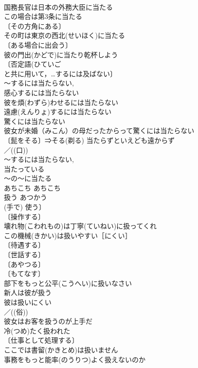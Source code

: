 \documentclass[8pt]{extreport}
\begin{document}
\begin{CJK}{UTF8}{min}
\\	国務長官は日本の外務大臣に当たる 
\\	この場合は第3条に当たる 
\\	〔その方角にある〕 
\\	その町は東京の西北(せいほく)に当たる 
\\	〔ある場合に出会う〕 
\\	彼の門出(かどで)に当たり乾杯しよう 
\\	〔否定語(ひていご　
\\	と共に用いて，…するには及ばない〕 
\\	〜するには当たらない, 
\\	感心するには当たらない 
\\	彼を煩(わずら)わせるには当たらない 
\\	遠慮(えんりょ)するには当たらない 
\\	驚くには当たらない 
\\	彼女が未婚（みこん）の母だったからって驚くには当たらない 
\\	〔髭をそる〕⇒そる(剃る) 当たらずといえども遠からず 
\\	／((口)) 
\\	〜するには当たらない, 
\\	当たっている 
\\	〜の〜に当たる
\\	あちこち	あちこち	
\\	扱う	あつかう	
\\	(手で) 使う〕
\\	〔操作する〕
\\	壊れ物(こわれもの)は丁寧(ていねい)に扱ってくれ 
\\	この機械(きかい)は扱いやすい［にくい］ 
\\	〔待遇する〕
\\	〔世話する〕
\\	〔あやつる〕
\\	〔もてなす〕
\\	部下をもっと公平(こうへい)に扱いなさい 
\\	新人は彼が扱う 
\\	彼は扱いにくい 
\\	／((俗)) 
\\	彼女はお客を扱うのが上手だ 
\\	冷(つめ)たく扱われた 
\\	〔仕事として処理する〕 
\\	ここでは書留(かきとめ)は扱いません 
\\	事務をもっと能率(のうりつ)よく扱えないのか 

\end{CJK}
\end{document}

